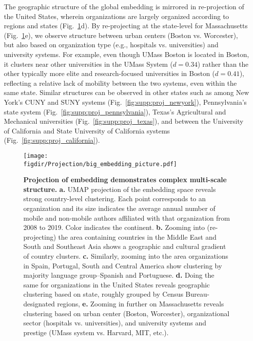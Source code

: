 \documentclass[12pt]{article} %
\def\figdir{../Figs}
\begin{document}
The geographic structure of the global embedding is mirrored in re-projection of the United States, wherein organizations are largely organized according to regions and states (Fig.~\ref{fig:projection}d).
By re-projecting at the state-level for Massachusetts (Fig.~\ref{fig:projection}e), we observe structure between urban centers (Boston vs. Worcester), but also based on organization type (e.g., hospitals vs. universities) and university systems.
For example, even though UMass Boston is located in Boston, it clusters near other universities in the UMass System ($d = 0.34$) rather than the other typically more elite and research-focused universities in Boston ($d = 0.41$), reflecting a relative lack of mobility between the two systems, even within the same state.
Similar structures can be observed in other states such as among New York's CUNY and SUNY systems (Fig.~\ref{fig:supp:proj_newyork}), Pennsylvania's state system (Fig.~\ref{fig:supp:proj_pennsylvania}), Texas's Agricultural and Mechanical universities (Fig.~\ref{fig:supp:proj_texas}), and between the University of California and State University of California systems (Fig.~\ref{fig:supp:proj_california}). 

\begin{figure}[hp!]
	\centering
	\texttt{[image: \\figdir/Projection/big\_embedding\_picture.pdf]}
	\caption{
		\textbf{Projection of embedding demonstrates complex multi-scale structure.}
		\textbf{a.}
		UMAP projection \autocite{mcinnes2018umap} of the embedding space reveals strong country-level clustering.
		Each point corresponds to an organization and its size indicates the average annual number of mobile and non-mobile authors affiliated with that organization from 2008 to 2019. 
		Color indicates the continent.
		\textbf{b.} Zooming into (re-projecting) the area containing countries in the Middle East and South and Southeast Asia shows a geographic and cultural gradient of country clusters. 
		\textbf{c.} Similarly, zooming into the area organizations in Spain, Portugal, South and Central America show clustering by majority language group--Spanish and Portuguese.
		\textbf{d.} Doing the same for organizations in the United States reveals geographic clustering based on state, roughly grouped by Census Bureau-designated regions,
		\textbf{e.} Zooming in further on Massachusetts reveals clustering based on urban center (Boston, Worcester), organizational sector (hospitals vs. universities), and university systems and prestige (UMass system vs. Harvard, MIT, etc.).
	}
	\label{fig:projection}
\end{figure}
\end{document}
